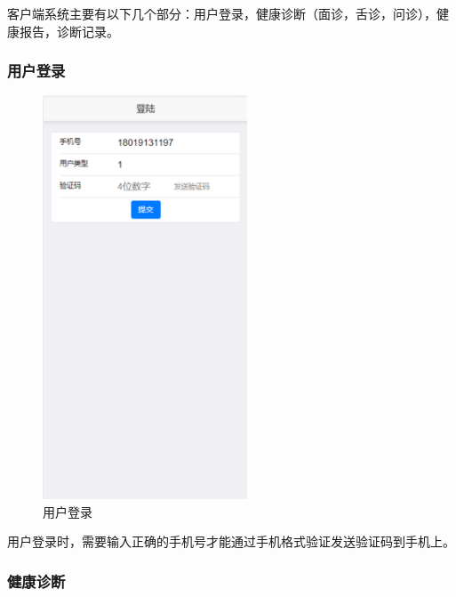 客户端系统主要有以下几个部分：用户登录，健康诊断（面诊，舌诊，问诊），健康报告，诊断记录。

\subsubsection{用户登录}
\begin{figure}[ht]
    \centering
    \includegraphics[height=12cm]{images/login.png}
    \caption{用户登录}
    \label{fig:login}
\end{figure} 
用户登录时，需要输入正确的手机号才能通过手机格式验证发送验证码到手机上。
 

\subsubsection{健康诊断}


